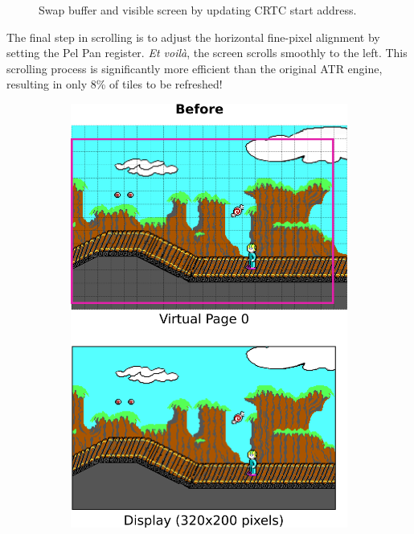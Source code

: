 \documentclass[book.tex]{subfiles}
\begin{document}
\begin{figure}[H]
\centering
 \caption{Swap buffer and visible screen by updating CRTC start address.}
 \label{fig:kc4_6_step4}
\end{figure}

\pagebreak
The final step in scrolling is to adjust the horizontal fine-pixel alignment by setting the Pel Pan register. \textit{Et voil\`a}, the screen scrolls smoothly to the left. This scrolling process is significantly more efficient than the original ATR engine, resulting in only 8\% of tiles to be refreshed!\\

\begin{figure}[H]
\centering
\begin{subfigure}{.5\textwidth}
\centering
  \includegraphics[width=.95\linewidth]{screenshots_300dpi/game/Scroll_KC4_6_1.png}

\end{subfigure}
\end{figure}
\end{document}
